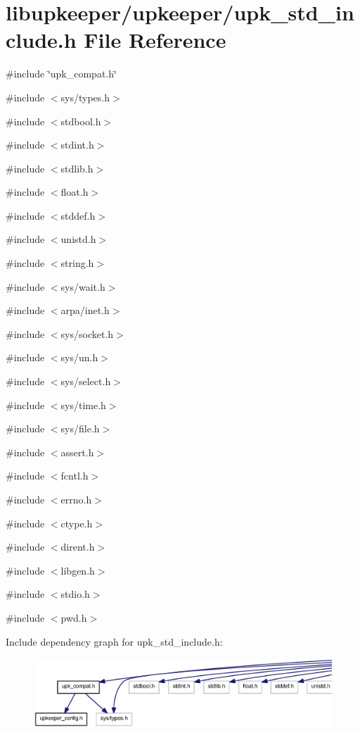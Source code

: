 \section{libupkeeper/upkeeper/upk\_\-std\_\-include.h File Reference}
\label{upk__std__include_8h}
{\ttfamily \#include \char`\"{}upk\_\-compat.h\char`\"{}}\par
{\ttfamily \#include $<$sys/types.h$>$}\par
{\ttfamily \#include $<$stdbool.h$>$}\par
{\ttfamily \#include $<$stdint.h$>$}\par
{\ttfamily \#include $<$stdlib.h$>$}\par
{\ttfamily \#include $<$float.h$>$}\par
{\ttfamily \#include $<$stddef.h$>$}\par
{\ttfamily \#include $<$unistd.h$>$}\par
{\ttfamily \#include $<$string.h$>$}\par
{\ttfamily \#include $<$sys/wait.h$>$}\par
{\ttfamily \#include $<$arpa/inet.h$>$}\par
{\ttfamily \#include $<$sys/socket.h$>$}\par
{\ttfamily \#include $<$sys/un.h$>$}\par
{\ttfamily \#include $<$sys/select.h$>$}\par
{\ttfamily \#include $<$sys/time.h$>$}\par
{\ttfamily \#include $<$sys/file.h$>$}\par
{\ttfamily \#include $<$assert.h$>$}\par
{\ttfamily \#include $<$fcntl.h$>$}\par
{\ttfamily \#include $<$errno.h$>$}\par
{\ttfamily \#include $<$ctype.h$>$}\par
{\ttfamily \#include $<$dirent.h$>$}\par
{\ttfamily \#include $<$libgen.h$>$}\par
{\ttfamily \#include $<$stdio.h$>$}\par
{\ttfamily \#include $<$pwd.h$>$}\par
Include dependency graph for upk\_\-std\_\-include.h:\nopagebreak
\begin{figure}[H]
\begin{center}
\leavevmode
\includegraphics[width=400pt]{upk__std__include_8h__incl}
\end{center}
\end{figure}
